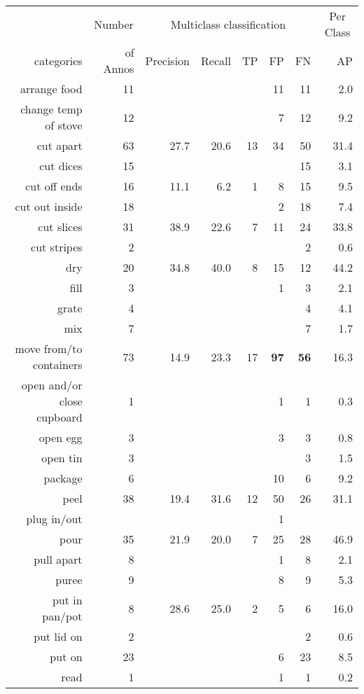 \begin{tabular}{r r r@{\ \ }r@{\ \ }r@{\ \ }r@{\ \ }r r}
\toprule  & \multicolumn{1}{c}{Number}  & \multicolumn{5}{c}{Multiclass classification}  & \multicolumn{1}{c}{Per Class} \\
categories&of Annos&Precision&Recall&TP&FP&FN&AP\\
\cmidrule(lr){1-1} \cmidrule(lr){2-2} \cmidrule(lr){3-7} \cmidrule(lr){8-8}
arrange food & 11 &  &  &  & 11 & 11 & 2.0 \\
change temp of stove & 12 &  &  &  & 7 & 12 & 9.2 \\
cut apart & 63 & 27.7 & 20.6 & 13 & 34 & 50 & 31.4 \\
cut dices & 15 &  &  &  &  & 15 & 3.1 \\
cut off ends & 16 & 11.1 & 6.2 & 1 & 8 & 15 & 9.5 \\
cut out inside & 18 &  &  &  & 2 & 18 & 7.4 \\
cut slices & 31 & 38.9 & 22.6 & 7 & 11 & 24 & 33.8 \\
cut stripes & 2 &  &  &  &  & 2 & 0.6 \\
dry & 20 & 34.8 & 40.0 & 8 & 15 & 12 & 44.2 \\
fill & 3 &  &  &  & 1 & 3 & 2.1 \\
grate & 4 &  &  &  &  & 4 & 4.1 \\
mix & 7 &  &  &  &  & 7 & 1.7 \\
move from/to containers & 73 & 14.9 & 23.3 & 17 & \textbf{97} & \textbf{56} & 16.3 \\
open and/or close cupboard & 1 &  &  &  & 1 & 1 & 0.3 \\
open egg & 3 &  &  &  & 3 & 3 & 0.8 \\
open tin & 3 &  &  &  &  & 3 & 1.5 \\
package & 6 &  &  &  & 10 & 6 & 9.2 \\
peel & 38 & 19.4 & 31.6 & 12 & 50 & 26 & 31.1 \\
plug in/out &  &  &  &  & 1 &  &  \\
pour & 35 & 21.9 & 20.0 & 7 & 25 & 28 & 46.9 \\
pull apart & 8 &  &  &  & 1 & 8 & 2.1 \\
puree & 9 &  &  &  & 8 & 9 & 5.3 \\
put in pan/pot & 8 & 28.6 & 25.0 & 2 & 5 & 6 & 16.0 \\
put lid on & 2 &  &  &  &  & 2 & 0.6 \\
put on & 23 &  &  &  & 6 & 23 & 8.5 \\
read & 1 &  &  &  & 1 & 1 & 0.2 \\

\end{tabular}
